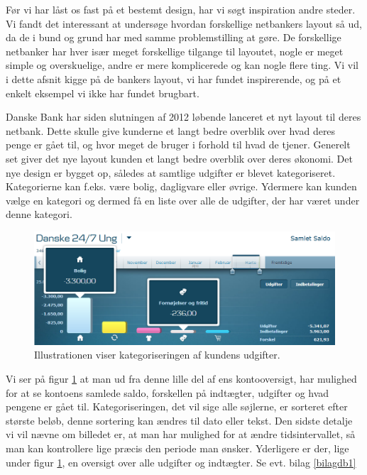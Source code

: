 Før vi har låst os fast på et bestemt design, har vi søgt inspiration andre steder. Vi fandt det interessant at undersøge hvordan forskellige netbankers layout så ud, da de i bund og grund har med samme problemstilling at gøre. De forskellige netbanker har hver især meget forskellige tilgange til layoutet, nogle er meget simple og overskuelige, andre er mere komplicerede og kan nogle flere ting. Vi vil i dette afsnit kigge på de bankers layout, vi har fundet inspirerende, og på et enkelt eksempel vi ikke har fundet brugbart.

Danske Bank har siden slutningen af 2012 løbende lanceret et nyt layout til deres netbank\cite{Danskebank}. Dette skulle give kunderne et langt bedre overblik over hvad deres penge er gået til, og hvor meget de bruger i forhold til hvad de tjener. Generelt set giver det nye layout kunden et langt bedre overblik over deres økonomi. Det nye design er bygget op, således at samtlige udgifter er blevet kategoriseret. Kategorierne kan f.eks. være bolig, dagligvare eller øvrige. Ydermere kan kunden vælge en kategori og dermed få en liste over alle de udgifter, der har været under denne kategori. 

\begin{figure}[h!]
\centering
\includegraphics[width=1.0\textwidth]{Billeder/DanskeB.png}
\caption{ Illustrationen viser kategoriseringen af kundens udgifter.}
\label{DanskeB}
\end{figure}

Vi ser på figur \ref{DanskeB} at man ud fra denne lille del af ens kontooversigt, har mulighed for at se kontoens samlede saldo, forskellen på indtægter, udgifter og hvad pengene er gået til. Kategoriseringen, det vil sige alle søjlerne, er sorteret efter største beløb, denne sortering kan ændres til dato eller tekst. Den sidste detalje vi vil nævne om billedet er, at man har mulighed for at ændre tidsintervallet, så man kan kontrollere lige præcis den periode man ønsker. Yderligere er der, lige under figur \ref{DanskeB}, en oversigt over alle udgifter og indtægter. Se evt. bilag \ref{bilagdb1}

